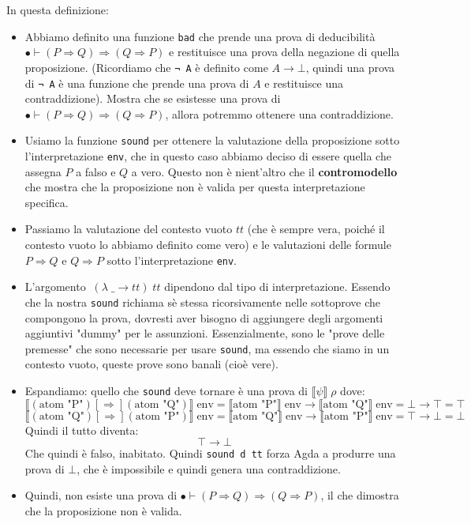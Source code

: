 \documentclass[a4paper]{article}
\theoremstyle{definition}
\theoremstyle{remark}
\begin{document}
In questa definizione:
\begin{itemize}
  \item Abbiamo definito una funzione \texttt{bad} che prende una prova di deducibilità \( • ⊢ (P ⇒ Q) ⇒ (Q ⇒ P) \)
  e restituisce una prova della negazione di quella proposizione.
  (Ricordiamo che \texttt{¬ A} è definito come \( A \to \bot \), quindi una prova di \texttt{¬ A} è una funzione che prende una prova di \( A \) e restituisce una contraddizione).
  Mostra che se esistesse una prova di \( • ⊢ (P ⇒ Q) ⇒ (Q ⇒ P) \), allora potremmo ottenere una contraddizione.
  \item Usiamo la funzione \texttt{sound} per ottenere la valutazione della proposizione sotto l'interpretazione \texttt{env},
  che in questo caso abbiamo deciso di essere quella che assegna \( P \) a falso e \( Q \) a vero.
  Questo non è nient'altro che il \textbf{contromodello} che mostra che la proposizione non è valida per questa interpretazione specifica.
  \item Passiamo la valutazione del contesto vuoto \( tt \) (che è sempre vera, poiché il contesto vuoto lo abbiamo definito come vero) e le valutazioni delle formule \( P ⇒ Q \) e \( Q ⇒ P \) sotto l'interpretazione \texttt{env}.
  \item L'argomento \(\ (\lambda \; \_ \to tt) \; tt \) dipendono dal tipo di interpretazione.
  Essendo che la nostra \texttt{sound} richiama sè stessa ricorsivamente nelle sottoprove che compongono la prova,
  dovresti aver bisogno di aggiungere degli argomenti aggiuntivi "dummy" per le assunzioni. 
  Essenzialmente, sono le "prove delle premesse" che sono necessarie per usare \texttt{sound}, ma essendo
  che siamo in un contesto vuoto, queste prove sono banali (cioè vere).
  \item Espandiamo: quello che \texttt{sound} deve tornare è una prova di \(\llbracket \psi \rrbracket \; \rho \) dove:
  \[\llbracket (\text{atom "P"}) [⇒] (\text{atom "Q"}) \rrbracket \; \text{env} = \llbracket \text{atom "P"} \rrbracket \; \text{env} \to \llbracket \text{atom "Q"} \rrbracket \; \text{env} = \bot \to \top = \top\]
  \[ \llbracket (\text{atom "Q"}) [⇒] (\text{atom "P"}) \rrbracket \; \text{env} = \llbracket \text{atom "Q"} \rrbracket \; \text{env} \to \llbracket \text{atom "P"} \rrbracket \; \text{env} = \top \to \bot = \bot\]
  Quindi il tutto diventa:
  \[\top \to \bot\]
  Che quindi è falso, inabitato.
  Quindi \texttt{sound d tt} forza Agda a produrre una prova di \(\bot\), che è impossibile e quindi genera una contraddizione.
  \item Quindi, non esiste una prova di \( • ⊢ (P ⇒ Q) ⇒ (Q ⇒ P) \), il che dimostra che la proposizione non è valida.
\end{itemize}
\end{document}
